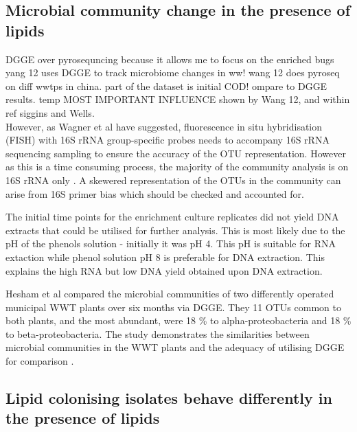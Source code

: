 \documentclass[11pt]{article}
\begin{document}
\subsection{Microbial community change in the presence of lipids}
DGGE over pyrosequncing because it allows me to focus on the enriched bugs
yang 12 uses DGGE to track microbiome changes in ww!
wang 12 does pyroseq on diff wwtps in china. part of the dataset is initial COD! ompare to DGGE results. temp MOST IMPORTANT INFLUENCE shown by Wang 12, and within ref siggins and Wells.
\\However, as Wagner et al have suggested, fluorescence in situ hybridisation (FISH) with 16S rRNA  group-specific probes needs to accompany 16S rRNA sequencing sampling to ensure the accuracy of the OTU representation. However as this is a time consuming process, the majority of the community analysis is on 16S rRNA only \cite{Wagner_02} . A skewered representation of the OTUs in the community can arise from 16S primer bias which should be checked and accounted for.

The initial time points for the enrichment culture replicates did not yield DNA extracts that could be utilised for further analysis. This is most likely due to the pH of the phenols solution - initially it was pH 4. This pH is suitable for RNA extaction while phenol solution pH 8 is preferable for DNA extraction. This explains the high RNA but low DNA yield obtained upon DNA extraction.

Hesham et al compared the microbial communities of two differently operated municipal WWT plants over six months via DGGE. They 11 OTUs common to both plants, and the most abundant, were 18 \% to alpha-proteobacteria and 18 \% to beta-proteobacteria. The study demonstrates the similarities between microbial communities in the WWT plants and the adequacy of utilising DGGE for comparison \cite{Hesham_11}.

\subsection{Lipid colonising isolates behave differently in the presence of lipids}
\end{document}
